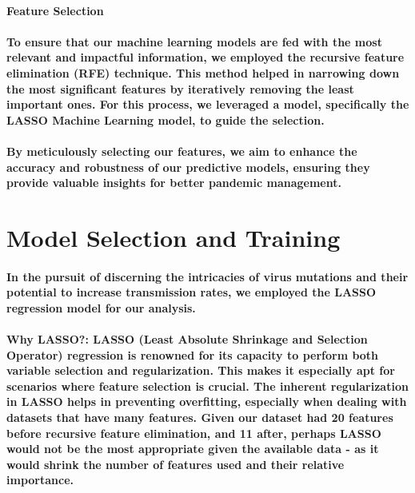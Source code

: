\documentclass{article}
\begin{document}
\paragraph{\textbf{Feature Selection}}
\paragraph{To ensure that our machine learning models are fed with the most relevant and impactful information, we employed the recursive feature elimination (RFE) technique. This method helped in narrowing down the most significant features by iteratively removing the least important ones. For this process, we leveraged a model, specifically the LASSO Machine Learning model, to guide the selection.}
\paragraph{By meticulously selecting our features, we aim to enhance the accuracy and robustness of our predictive models, ensuring they provide valuable insights for better pandemic management.}
\section{\textbf{Model Selection and Training}}
\paragraph{In the pursuit of discerning the intricacies of virus mutations and their potential to increase transmission rates, we employed the LASSO regression model for our analysis.}
\paragraph{\textbf{}}
\paragraph{\textbf{Why LASSO?}: LASSO (Least Absolute Shrinkage and Selection Operator) regression is renowned for its capacity to perform both variable selection and regularization. This makes it especially apt for scenarios where feature selection is crucial. The inherent regularization in LASSO helps in preventing overfitting, especially when dealing with datasets that have many features. Given our dataset had 20 features before recursive feature elimination, and 11 after, perhaps LASSO would not be the most appropriate given the available data - as it would shrink the number of features used and their relative importance.}
\end{document}
